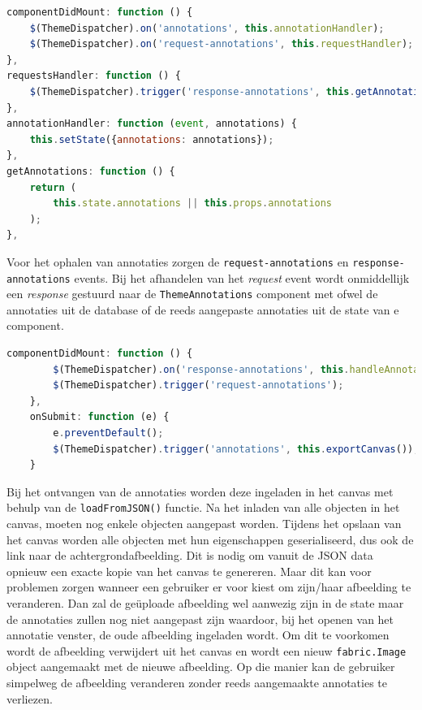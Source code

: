 \begin{lstlisting}[caption={Theme component - Events},label=lst:ThemeDispatcherEventsTheme,language=javascript]
componentDidMount: function () {
	$(ThemeDispatcher).on('annotations', this.annotationHandler);
	$(ThemeDispatcher).on('request-annotations', this.requestHandler);
},
requestsHandler: function () {
	$(ThemeDispatcher).trigger('response-annotations', this.getAnnotations());
},
annotationHandler: function (event, annotations) {
	this.setState({annotations: annotations});
},
getAnnotations: function () {
	return (
		this.state.annotations || this.props.annotations
	);
},
\end{lstlisting}

Voor het ophalen van annotaties zorgen de \texttt{request-annotations} en \texttt{response-annotations} events. Bij het afhandelen van het \textit{request} event wordt onmiddellijk een \textit{response} gestuurd naar de \texttt{ThemeAnnotations} component met ofwel de annotaties uit de database of de reeds aangepaste annotaties uit de state van e component. 

\begin{lstlisting}[caption={ThemeAnnotations component - Events},label=lst:ThemeDispatcherEventsThemeAnnotations,language=javascript]
	componentDidMount: function () {
	  	$(ThemeDispatcher).on('response-annotations', this.handleAnnotations);
		$(ThemeDispatcher).trigger('request-annotations');
	},
	onSubmit: function (e) {
		e.preventDefault();
		$(ThemeDispatcher).trigger('annotations', this.exportCanvas());
	}
\end{lstlisting}

Bij het ontvangen van de annotaties worden deze ingeladen in het canvas met behulp van de \texttt{loadFromJSON()} functie. Na het inladen van alle objecten in het canvas, moeten nog enkele objecten aangepast worden. Tijdens het opslaan van het canvas worden alle objecten met hun eigenschappen geserialiseerd, dus ook de link naar de achtergrondafbeelding. Dit is nodig om vanuit de JSON data opnieuw een exacte kopie van het canvas te genereren. Maar dit kan voor problemen zorgen wanneer een gebruiker er voor kiest om zijn/haar afbeelding te veranderen. Dan zal de ge\"{u}ploade afbeelding wel aanwezig zijn in de state maar de annotaties zullen nog niet aangepast zijn waardoor, bij het openen van het annotatie venster, de oude afbeelding ingeladen wordt. Om dit te voorkomen wordt de afbeelding verwijdert uit het canvas en wordt een nieuw \texttt{fabric.Image} object aangemaakt met de nieuwe afbeelding. Op die manier kan de gebruiker simpelweg de afbeelding veranderen zonder reeds aangemaakte annotaties te verliezen. 

